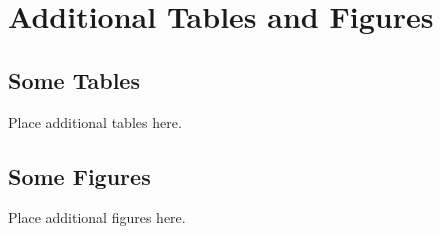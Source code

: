 
\chapter[ADDITIONAL TABLES AND FIGURES]{Additional Tables and Figures}
\section{Some Tables}

Place additional tables here.

\section{Some Figures}

Place additional figures here.
